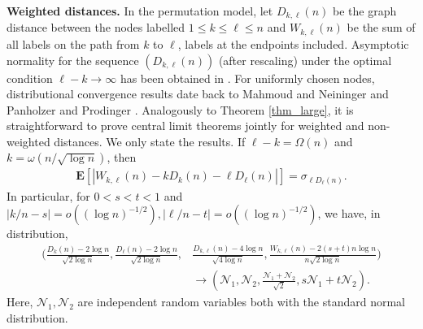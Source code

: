 \documentclass{amsart}       %
\newcommand{\sN}{\mathcal N}
\newcommand{\E}[1]{\ensuremath{\mathbf{E} \left[#1 \right]}}
\begin{document}
\medskip  \textbf{Weighted distances.}
In the permutation model, let $D_{k,\ell}(n)$ be the graph distance between the nodes labelled $1 \leq k \leq \ell \leq n$ and $W_{k,\ell}(n)$ be the sum of all labels on the path from $k$ to $\ell$, labels at the endpoints included. Asymptotic normality for the sequence $(D_{k,\ell}(n))$ (after rescaling) under the optimal condition $\ell - k \to \infty$ has been obtained in \cite{denefinger04}. For uniformly chosen nodes, distributional convergence results date back to Mahmoud and Neininger \cite{mane03} and Panholzer and Prodinger \cite{papr04}.
Analogously to Theorem \ref{thm_large}, it is straightforward to prove central limit theorems jointly for weighted and non-weighted distances. We only state the results. 
If $\ell - k = \Omega(n)$ and $k = \omega(n / \sqrt{\log n})$, then
\begin{align*} \E{|W_{k,\ell}(n) - kD_k(n) - \ell D_\ell(n)|} = \sigma_{\ell D_\ell(n)}. \end{align*}
In particular, for $0 < s < t < 1$ and $|k/n - s| = o((\log n)^{-1/2}), |\ell/n - t| = o((\log n)^{-1/2})$, we have, in distribution,
\begin{align*}
\Bigg(\frac{D_k(n) - 2 \log n}{\sqrt{2 \log n}}, \frac{D_\ell(n) - 2 \log n}{\sqrt{2 \log n}}, &  \frac{D_{k,\ell}(n) - 4 \log n}{\sqrt{4 \log n}},  \frac{W_{k,\ell}(n) - 2 (s+t) n \log n}{n \sqrt{2 \log n}}\Bigg) \nonumber \\
& \to \left(\sN_1, \sN_2, \frac{\sN_1 + \sN_2}{\sqrt{2}}, s \sN_1 + t \sN_2\right).   \end{align*}
Here, $\sN_1, \sN_2$ are  independent random variables both with the standard normal distribution. 
\end{document}
